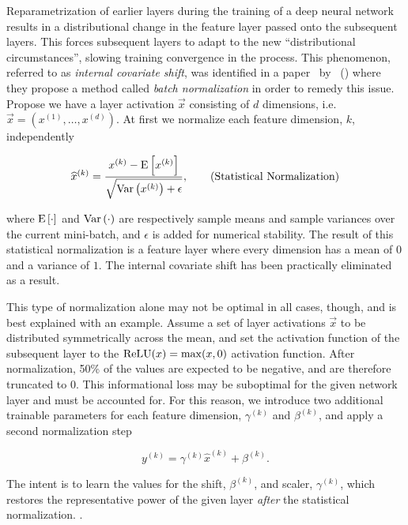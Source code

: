 Reparametrization of earlier layers during the training of a deep neural network results in a distributional change in the feature layer passed onto the subsequent layers.
This forces subsequent layers to adapt to the new \enquote{distributional circumstances}, slowing training convergence in the process.
This phenomenon, referred to as \textit{internal covariate shift}, was identified in a paper~\cite{batch-normalization} by \citeauthor{batch-normalization}~(\citeyear{batch-normalization}) where they propose a method called \textit{batch normalization} in order to remedy this issue.
Propose we have a layer activation $\vec{x}$ consisting of $d$ dimensions, i.e. $\vec{x} = (x^{(1)}, \ldots, x^{(d)})$.
At first we normalize each feature dimension, $k$, independently

\begin{equation*}
  \widehat{x}^{(k)}
  =
  \frac{
    x^{(k)} - \mathrm{E} \left[x^{(k)} \right]
  }{
    \sqrt{\mathrm{Var} \left(x^{(k)} \right) + \epsilon}
  },
  \tag{Statistical Normalization}
\end{equation*}

where $\mathrm{E} \left[\cdot \right]$ and $\mathrm{Var} \left(\cdot \right)$ are respectively sample means and sample variances over the current mini-batch, and $\epsilon$ is added for numerical stability.
The result of this statistical normalization is a feature layer where every dimension has a mean of $0$ and a variance of $1$.
The internal covariate shift has been practically eliminated as a result.

This type of normalization alone may not be optimal in all cases, though, and is best explained with an example.
Assume a set of layer activations $\vec{x}$ to be distributed symmetrically across the mean, and set the activation function of the subsequent layer to the $\mathrm{ReLU}(x) = \max(x,0)$ activation function.
After normalization, 50\% of the values are expected to be negative, and are therefore truncated to $0$.
This informational loss may be suboptimal for the given network layer and must be accounted for.
For this reason, we introduce two additional trainable parameters for each feature dimension, $\gamma^{(k)}$ and $\beta^{(k)}$, and apply a second normalization step

\begin{equation*}
  y^{(k)} = \gamma^{(k)} \widehat{x}^{(k)} + \beta^{(k)}.
  \tag{Trainable Normalization}
\end{equation*}

The intent is to learn the values for the shift, $\beta^{(k)}$, and scaler, $\gamma^{(k)}$, which restores the representative power of the given layer \textit{after} the statistical normalization.
.
